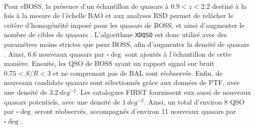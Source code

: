 

\paragraph{}
Pour eBOSS, la présence d'un échantillon de quasars à $\num{0,9} < z < \num{2,2}$ destiné à la fois à la mesure de l'échelle BAO et aux analyses RSD permet de relâcher le critère d'homogénéité imposé pour les quasars de BOSS, et ainsi d'augmenter le nombre de cibles de quasars \lya{}.
L'algorithme \texttt{XDQSO} est donc utilisé avec des paramètres moins strictes que pour BOSS, afin d'augmenter la densité de quasars \lya{}.
Ainsi, \num{6,6} nouveaux quasars par $\si{\square\deg}$ sont ajoutés à l'échantillon de cette manière.
Ensuite, les QSO de BOSS ayant un rapport signal sur bruit $\num{0,75} < S/R < \num{3}$ et ne comprenant pas de BAL sont réobservés.
Enfin, de nouveaux candidats quasars sont sélectionnés gr\^ace aux données de PTF, avec une densité de $\SI{3,2}{deg^{-2}}$. Les catalogues FIRST fournissent eux aussi de nouveaux quasars potentiels, avec une densité de $\SI{1}{deg^{-2}}$.
Ainsi, un total d'environ 8 QSO par $\si{\square\deg}$ seront réobservés, accompagnés d'environ 11 nouveaux quasars par $\si{\square\deg}$.



